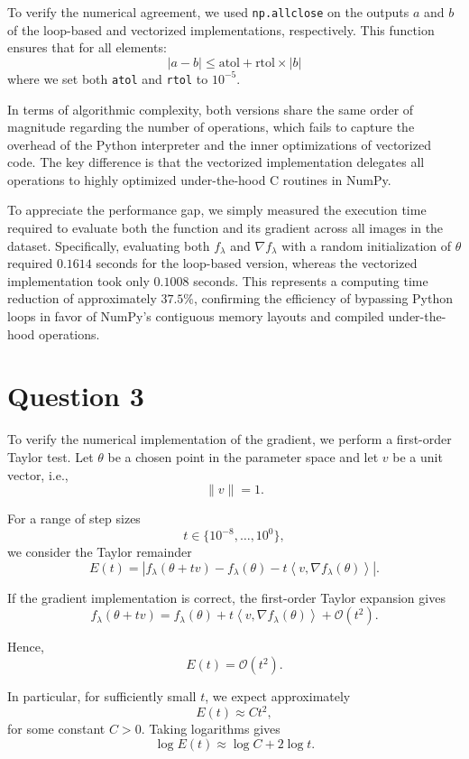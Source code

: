 \documentclass{article}
\theoremstyle{definition}
\theoremstyle{remark}
\begin{document}
To verify the numerical agreement, we used \texttt{np.allclose} on the outputs $a$ and $b$ of the loop-based and vectorized implementations, respectively. This function ensures that for all elements:
$$
\lvert a - b \rvert \leq \text{atol} + \text{rtol} \times \lvert b \rvert
$$
where we set both \texttt{atol} and \texttt{rtol} to $10^{-5}$.
\vspace{1em}

In terms of algorithmic complexity, both versions share the same order of magnitude regarding the number of operations, which fails to capture the overhead of the Python interpreter and the inner optimizations of vectorized code. The key difference is that the vectorized implementation delegates all operations to highly optimized under-the-hood C routines in NumPy. 

To appreciate the performance gap, we simply measured the execution time required to evaluate both the function and its gradient across all images in the dataset. Specifically, evaluating both $f_\lambda$ and $\nabla f_\lambda$ with a random initialization of $\theta$ required $0.1614$ seconds for the loop-based version, whereas the vectorized implementation took only $0.1008$ seconds. This represents a computing time reduction of approximately $37.5\%$, confirming the efficiency of bypassing Python loops in favor of NumPy's contiguous memory layouts and compiled under-the-hood operations.

\section*{Question 3}
\label{Q3}
To verify the numerical implementation of the gradient, we perform a first-order Taylor test. Let $\theta$ be a chosen point in the parameter space and let $v$ be a unit vector, i.e.,
\[
\|v\| = 1.
\]

For a range of step sizes
\[
t \in \{10^{-8}, \ldots, 10^0\},
\]
we consider the Taylor remainder
\[
E(t)
=
\left|
f_\lambda(\theta + tv)
-
f_\lambda(\theta)
-
t\left\langle v,\nabla f_\lambda(\theta)\right\rangle
\right|.
\]

If the gradient implementation is correct, the first-order Taylor expansion gives
\[
f_\lambda(\theta + tv)
=
f_\lambda(\theta)
+
t\left\langle v,\nabla f_\lambda(\theta)\right\rangle
+
\mathcal{O}(t^2).
\]

Hence,
\[
E(t) = \mathcal{O}(t^2).
\]

In particular, for sufficiently small $t$, we expect approximately
\[
E(t) \approx C t^2,
\]
for some constant $C>0$. Taking logarithms gives
\[
\log E(t)
\approx
\log C + 2\log t.
\]
\end{document}
